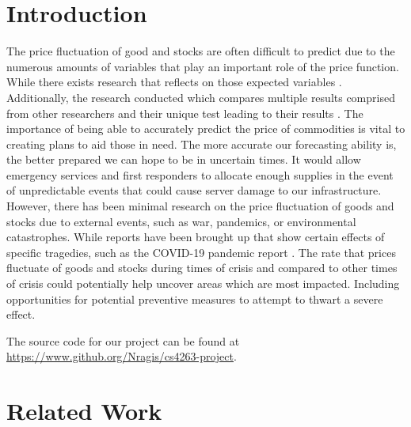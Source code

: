 \documentclass[final]{cvpr}
\begin{document}
\section{Introduction}

    The price fluctuation of good and stocks are often difficult to predict due to
    the numerous amounts of variables that play an important role of the price
    function. While there exists research that reflects on those expected variables
    \cite{romero}. Additionally, the research conducted which compares multiple results
    comprised from other researchers and their unique test leading to their results
    \cite{srivastava}.  The importance of being able to accurately predict the price of
    commodities is vital to creating plans to aid those in need. The more accurate
    our forecasting ability is, the better prepared we can hope to be in uncertain
    times. It would allow emergency services and first responders to allocate enough
    supplies in the event of unpredictable events that could cause server damage to
    our infrastructure.  However, there has been minimal research on the price
    fluctuation of goods and stocks due to external events, such as war, pandemics,
    or environmental catastrophes. While reports have been brought up that show
    certain effects of specific tragedies, such as the COVID-19 pandemic report
    \cite{mead}. The rate that prices fluctuate of goods and stocks during times of
    crisis and compared to other times of crisis could potentially help uncover
    areas which are most impacted. Including opportunities for potential preventive
    measures to attempt to thwart a severe effect.

    The source code for our project can be found at 
    \url{https://www.github.org/Nragis/cs4263-project}.

\section{Related Work}
\end{document}
